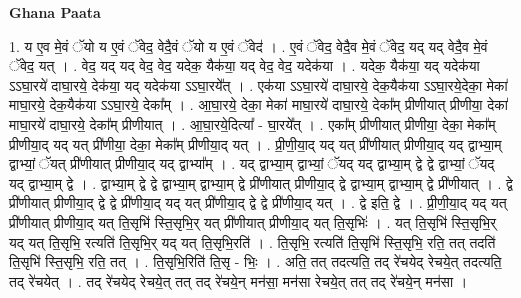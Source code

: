 \documentclass[17pt]{extarticle}
\begin{document}
\textbf{Ghana Paata } \newline

1. य ए॒व मे॒वं ॅयो य ए॒वं ॅवेद॒ वेदै॒वं ॅयो य ए॒वं ॅवेद॑ । . ए॒वं ॅवेद॒ वेदै॒व मे॒वं ॅवेद॒ यद् यद् वेदै॒व मे॒वं ॅवेद॒ यत् । . वेद॒ यद् यद् वेद॒ वेद॒ यदेक॒ यैक॑या॒ यद् वेद॒ वेद॒ यदेक॑या । . यदेक॒ यैक॑या॒ यद् यदेक॑या ऽऽघा॒रये॑ दाघा॒रये॒ देक॑या॒ यद् यदेक॑या ऽऽघा॒रये᳚त् । . एक॑या ऽऽघा॒रये॑ दाघा॒रये॒ देक॒यैक॑या ऽऽघा॒रये॒देका॒ मेका॑ माघा॒रये॒ देक॒यैक॑या ऽऽघा॒रये॒ देका᳚म् । . आ॒घा॒रये॒ देका॒ मेका॑ माघा॒रये॑ दाघा॒रये॒ देका᳚म् प्रीणीयात् प्रीणीया॒ देका॑ माघा॒रये॑ दाघा॒रये॒ देका᳚म् प्रीणीयात् । . आ॒घा॒रये॒दित्या᳚ - घा॒रये᳚त् । . एका᳚म् प्रीणीयात् प्रीणीया॒ देका॒ मेका᳚म् प्रीणीया॒द् यद् यत् प्री॑णीया॒ देका॒ मेका᳚म् प्रीणीया॒द् यत् । . प्री॒णी॒या॒द् यद् यत् प्री॑णीयात् प्रीणीया॒द् यद् द्वाभ्या॒म् द्वाभ्यां॒ ॅयत् प्री॑णीयात् प्रीणीया॒द् यद् द्वाभ्या᳚म् । . यद् द्वाभ्या॒म् द्वाभ्यां॒ ॅयद् यद् द्वाभ्या॒म् द्वे द्वे द्वाभ्यां॒ ॅयद् यद् द्वाभ्या॒म् द्वे । . द्वाभ्या॒म् द्वे द्वे द्वाभ्या॒म् द्वाभ्या॒म् द्वे प्री॑णीयात् प्रीणीया॒द् द्वे द्वाभ्या॒म् द्वाभ्या॒म् द्वे प्री॑णीयात् । . द्वे प्री॑णीयात् प्रीणीया॒द् द्वे द्वे प्री॑णीया॒द् यद् यत् प्री॑णीया॒द् द्वे द्वे प्री॑णीया॒द् यत् । . द्वे इति॒ द्वे । . प्री॒णी॒या॒द् यद् यत् प्री॑णीयात् प्रीणीया॒द् यत् ति॒सृभि॑ स्ति॒सृभि॒र् यत् प्री॑णीयात् प्रीणीया॒द् यत् ति॒सृभिः॑ । . यत् ति॒सृभि॑ स्ति॒सृभि॒र् यद् यत् ति॒सृभि॒ रत्यति॑ ति॒सृभि॒र् यद् यत् ति॒सृभि॒रति॑ । . ति॒सृभि॒ रत्यति॑ ति॒सृभि॑ स्ति॒सृभि॒ रति॒ तत् तदति॑ ति॒सृभि॑ स्ति॒सृभि॒ रति॒ तत् । . ति॒सृभि॒रिति॑ ति॒सृ - भिः॒ । . अति॒ तत् तदत्यति॒ तद् रे॑चयेद् रेचये॒त् तदत्यति॒ तद् रे॑चयेत् । . तद् रे॑चयेद् रेचये॒त् तत् तद् रे॑चये॒न् मन॑सा॒ मन॑सा रेचये॒त् तत् तद् रे॑चये॒न् मन॑सा । \newline
\end{document}
